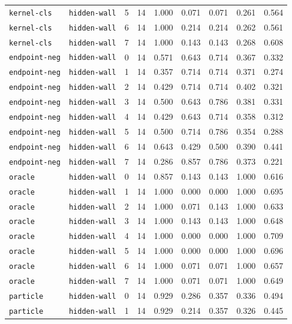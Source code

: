 \documentclass{article}
\begin{document}
\begin{center}
{\begin{tabular}{llllccccc}
\texttt{kernel-cls} & \texttt{hidden-wall} & 5 & 14 & 1.000 & 0.071 & 0.071 & 0.261 & 0.564 \\
\texttt{kernel-cls} & \texttt{hidden-wall} & 6 & 14 & 1.000 & 0.214 & 0.214 & 0.262 & 0.561 \\
\texttt{kernel-cls} & \texttt{hidden-wall} & 7 & 14 & 1.000 & 0.143 & 0.143 & 0.268 & 0.608 \\
\texttt{endpoint-neg} & \texttt{hidden-wall} & 0 & 14 & 0.571 & 0.643 & 0.714 & 0.367 & 0.332 \\
\texttt{endpoint-neg} & \texttt{hidden-wall} & 1 & 14 & 0.357 & 0.714 & 0.714 & 0.371 & 0.274 \\
\texttt{endpoint-neg} & \texttt{hidden-wall} & 2 & 14 & 0.429 & 0.714 & 0.714 & 0.402 & 0.321 \\
\texttt{endpoint-neg} & \texttt{hidden-wall} & 3 & 14 & 0.500 & 0.643 & 0.786 & 0.381 & 0.331 \\
\texttt{endpoint-neg} & \texttt{hidden-wall} & 4 & 14 & 0.429 & 0.643 & 0.714 & 0.358 & 0.312 \\
\texttt{endpoint-neg} & \texttt{hidden-wall} & 5 & 14 & 0.500 & 0.714 & 0.786 & 0.354 & 0.288 \\
\texttt{endpoint-neg} & \texttt{hidden-wall} & 6 & 14 & 0.643 & 0.429 & 0.500 & 0.390 & 0.441 \\
\texttt{endpoint-neg} & \texttt{hidden-wall} & 7 & 14 & 0.286 & 0.857 & 0.786 & 0.373 & 0.221 \\
\texttt{oracle} & \texttt{hidden-wall} & 0 & 14 & 0.857 & 0.143 & 0.143 & 1.000 & 0.616 \\
\texttt{oracle} & \texttt{hidden-wall} & 1 & 14 & 1.000 & 0.000 & 0.000 & 1.000 & 0.695 \\
\texttt{oracle} & \texttt{hidden-wall} & 2 & 14 & 1.000 & 0.071 & 0.143 & 1.000 & 0.633 \\
\texttt{oracle} & \texttt{hidden-wall} & 3 & 14 & 1.000 & 0.143 & 0.143 & 1.000 & 0.648 \\
\texttt{oracle} & \texttt{hidden-wall} & 4 & 14 & 1.000 & 0.000 & 0.000 & 1.000 & 0.709 \\
\texttt{oracle} & \texttt{hidden-wall} & 5 & 14 & 1.000 & 0.000 & 0.000 & 1.000 & 0.696 \\
\texttt{oracle} & \texttt{hidden-wall} & 6 & 14 & 1.000 & 0.071 & 0.071 & 1.000 & 0.657 \\
\texttt{oracle} & \texttt{hidden-wall} & 7 & 14 & 1.000 & 0.071 & 0.071 & 1.000 & 0.649 \\
\texttt{particle} & \texttt{hidden-wall} & 0 & 14 & 0.929 & 0.286 & 0.357 & 0.336 & 0.494 \\
\texttt{particle} & \texttt{hidden-wall} & 1 & 14 & 0.929 & 0.214 & 0.357 & 0.326 & 0.445 \\
\bottomrule
\end{tabular}%
}
\end{center}
\end{document}
